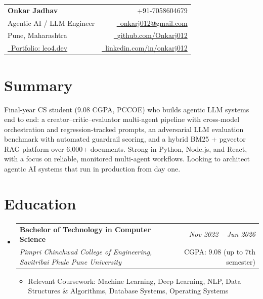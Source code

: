 \documentclass[a4paper,10.5pt]{article}
\makeatletter
\newcommand{\resumeSubheading}[4]{
\vspace{0.8mm}\item
    \begin{tabular*}{0.98\textwidth}[t]{l@{\extracolsep{\fill}}r}
        \textbf{#1} & \textit{\footnotesize{#4}} \\
        \textit{\footnotesize{#3}} & \footnotesize{#2}\\
    \end{tabular*}
    \vspace{-2.0mm}
}
\newcommand{\resumeSubHeadingListStart}{\begin{itemize}[leftmargin=0mm,label={}]}
\newcommand{\resumeItemListStart}{\begin{justify}\begin{itemize}[leftmargin=3ex, rightmargin=2ex, noitemsep, labelsep=1.2mm, itemsep=0.4mm]\small}
\newcommand{\resumeSubHeadingListEnd}{\end{itemize}\vspace{2mm}}
\newcommand{\resumeItemListEnd}{\end{itemize}\end{justify}\vspace{-2mm}}
\newcommand{\name}{Onkar Jadhav}
\newcommand{\phone}{7058604679}
\newcommand{\emaila}{onkarj012@gmail.com}
\newcommand{\github}{github.com/Onkarj012}
\newcommand{\linkedin}{linkedin.com/in/onkarj012}
\makeatother
\begin{document}
\selectfont

\begin{tabularx}{\linewidth}{L r}
  \textbf{\Large \name} & {\raisebox{0.0\height}{\footnotesize \faPhone}\ +91-\phone}\\
  {Agentic AI / LLM Engineer} &
  \href{mailto:\emaila}{\raisebox{0.0\height}{\footnotesize \faEnvelope}\ {\emaila}} \\
  {Pune, Maharashtra} &
  \href{https://\github}{\raisebox{0.0\height}{\footnotesize \faGithub}\ {\github}} \\
  {\href{https://leo4.dev}{\raisebox{0.0\height}{\footnotesize \faGlobe}\ Portfolio: leo4.dev}} &
  \href{https://\linkedin}{\raisebox{0.0\height}{\footnotesize \faLinkedin}\ {\linkedin}}
\end{tabularx}
\vspace{-4mm}

\section{\textbf{Summary}}
\vspace{1mm}
\small{
Final-year CS student (9.08 CGPA, PCCOE) who builds agentic LLM systems end to end: a creator--critic--evaluator multi-agent pipeline with cross-model orchestration and regression-tracked prompts, an adversarial LLM evaluation benchmark with automated guardrail scoring, and a hybrid BM25 + pgvector RAG platform over 6,000+ documents. Strong in Python, Node.js, and React, with a focus on reliable, monitored multi-agent workflows. Looking to architect agentic AI systems that run in production from day one.
}
\vspace{-3mm}

\section{\textbf{Education}}
  \resumeSubHeadingListStart
    \resumeSubheading
      {Bachelor of Technology in Computer Science}{CGPA: 9.08 (up to 7th semester)}
      {Pimpri Chinchwad College of Engineering, Savitribai Phule Pune University}{Nov 2022 -- Jun 2026}
      \resumeItemListStart
        \item {Relevant Coursework: Machine Learning, Deep Learning, NLP, Data Structures \& Algorithms, Database Systems, Operating Systems}
      \resumeItemListEnd
\resumeSubHeadingListEnd
\vspace{-6mm}
\end{document}
